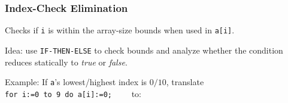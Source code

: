 \documentclass{beamer}
\begin{document}
\begin{frame}
\frametitle{Index-Check Elimination}

Checks if {\tt i} is within the array-size bounds when used in {\tt a[i]}.\smallskip

Idea: use {\tt IF-THEN-ELSE} to check bounds and analyze whether the
condition reduces statically to {\em true} or {\em false}.\smallskip

Example: If {\tt a}'s lowest/highest index is $0/10$, translate ~{\tt
for~i:=0~to~9~do~a[i]:=0;} ~~~~to:
\vspace{1ex}


\end{frame}
\end{document}
